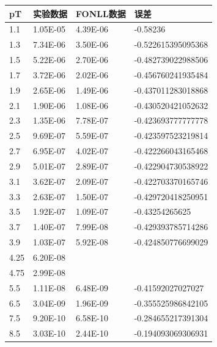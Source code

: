\documentclass{ctexart}
\begin{document}
\begin{tabular}{llll}\hline
pT   & 实验数据     & FONLL数据  & 误差                 \\\hline
1.1  & 1.05E-05 & 4.39E-06 & -0.58236           \\
1.3  & 7.34E-06 & 3.50E-06 & -0.522615395095368 \\
1.5  & 5.22E-06 & 2.70E-06 & -0.482739022988506 \\
1.7  & 3.72E-06 & 2.02E-06 & -0.456760241935484 \\
1.9  & 2.65E-06 & 1.49E-06 & -0.437011283018868 \\
2.1  & 1.90E-06 & 1.08E-06 & -0.430520421052632 \\
2.3  & 1.35E-06 & 7.78E-07 & -0.423693777777778 \\
2.5  & 9.69E-07 & 5.59E-07 & -0.423597523219814 \\
2.7  & 6.95E-07 & 4.02E-07 & -0.422266043165468 \\
2.9  & 5.01E-07 & 2.89E-07 & -0.422904730538922 \\
3.1  & 3.62E-07 & 2.09E-07 & -0.422703370165746 \\
3.3  & 2.63E-07 & 1.50E-07 & -0.429720418250951 \\
3.5  & 1.92E-07 & 1.09E-07 & -0.43254265625     \\
3.7  & 1.40E-07 & 7.99E-08 & -0.429393785714286 \\
3.9  & 1.03E-07 & 5.92E-08 & -0.424850776699029 \\
4.25 & 6.20E-08 &          &                    \\
4.75 & 2.99E-08 &          &                    \\
5.5  & 1.11E-08 & 6.48E-09 & -0.41592027027027  \\
6.5  & 3.04E-09 & 1.96E-09 & -0.355525986842105 \\
7.5  & 9.20E-10 & 6.58E-10 & -0.284655217391304 \\
8.5  & 3.03E-10 & 2.44E-10 & -0.194093069306931 \\\hline          
\end{tabular}
\end{document}
